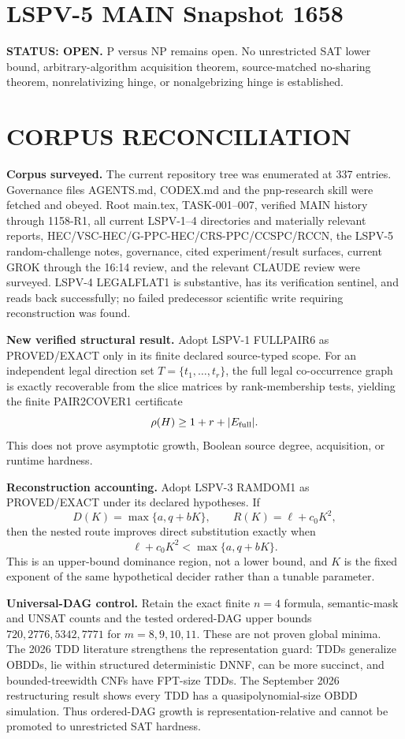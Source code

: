 \documentclass[11pt]{article}
\begin{document}
\section*{LSPV-5 MAIN Snapshot 1658}
\textbf{STATUS: OPEN.} P versus NP remains open. No unrestricted SAT lower bound, arbitrary-algorithm acquisition theorem, source-matched no-sharing theorem, nonrelativizing hinge, or nonalgebrizing hinge is established.

\section*{CORPUS RECONCILIATION}
\textbf{Corpus surveyed.} The current repository tree was enumerated at 337 entries. Governance files AGENTS.md, CODEX.md and the pnp-research skill were fetched and obeyed. Root main.tex, TASK-001--007, verified MAIN history through 1158-R1, all current LSPV-1--4 directories and materially relevant reports, HEC/VSC-HEC/G-PPC-HEC/CRS-PPC/CCSPC/RCCN, the LSPV-5 random-challenge notes, governance, cited experiment/result surfaces, current GROK through the 16:14 review, and the relevant CLAUDE review were surveyed. LSPV-4 LEGALFLAT1 is substantive, has its verification sentinel, and reads back successfully; no failed predecessor scientific write requiring reconstruction was found.

\textbf{New verified structural result.} Adopt LSPV-1 FULLPAIR6 as PROVED/EXACT only in its finite declared source-typed scope. For an independent legal direction set \(T=\{t_1,\ldots,t_r\}\), the full legal co-occurrence graph is exactly recoverable from the slice matrices by rank-membership tests, yielding the finite PAIR2COVER1 certificate
\[
\rho(H)\ge 1+r+|E_{\rm full}|.
\]
This does not prove asymptotic growth, Boolean source degree, acquisition, or runtime hardness.

\textbf{Reconstruction accounting.} Adopt LSPV-3 RAMDOM1 as PROVED/EXACT under its declared hypotheses. If
\[
D(K)=\max\{a,q+bK\},\qquad R(K)=\ell+c_0K^2,
\]
then the nested route improves direct substitution exactly when
\[
\ell+c_0K^2<\max\{a,q+bK\}.
\]
This is an upper-bound dominance region, not a lower bound, and \(K\) is the fixed exponent of the same hypothetical decider rather than a tunable parameter.

\textbf{Universal-DAG control.} Retain the exact finite \(n=4\) formula, semantic-mask and UNSAT counts and the tested ordered-DAG upper bounds \(720,2776,5342,7771\) for \(m=8,9,10,11\). These are not proven global minima. The 2026 TDD literature strengthens the representation guard: TDDs generalize OBDDs, lie within structured deterministic DNNF, can be more succinct, and bounded-treewidth CNFs have FPT-size TDDs. The September 2026 restructuring result shows every TDD has a quasipolynomial-size OBDD simulation. Thus ordered-DAG growth is representation-relative and cannot be promoted to unrestricted SAT hardness.
\end{document}
